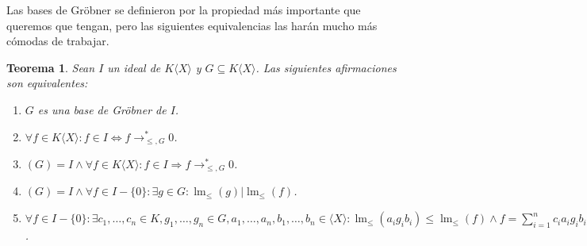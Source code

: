 \documentclass[12pt]{report}
\theoremstyle{customstyle}
\newtheorem{theorem}{Teorema}[chapter]
\theoremstyle{factstyle}
\DeclareMathOperator{\lm}{lm}
\begin{document}
Las bases de Gröbner se definieron por la propiedad más importante que queremos que tengan, pero las siguientes equivalencias las harán mucho más cómodas de trabajar.

\begin{theorem}\label{thm:equivalencias de base de Gröbner}
  Sean $I$ un ideal de $K⟨X⟩$ y $G ⊆ K⟨X⟩$. Las siguientes afirmaciones son equivalentes:
  \begin{enumerate}
    \item $G$ es una base de Gröbner de $I$. \label{thm:egb:1}

    \item $∀f ∈ K⟨X⟩ : f ∈ I ⇔ f →^*_{≤, G} 0$. \label{thm:egb:2}

    \item $(G) = I ∧ ∀f ∈ K⟨X⟩ : f ∈ I ⇒ f →^*_{≤, G} 0$. \label{thm:egb:3}

    \item $(G) = I ∧ ∀f ∈ I - \{0\} : ∃g ∈ G : \lm_≤(g) | \lm_≤(f)$. \label{thm:egb:4}

    \item $∀f ∈ I - \{0\} : ∃c_1, …, c_n ∈ K, g_1, …, g_n ∈ G, a_1, …, a_n, b_1, …, b_n ∈ ⟨X⟩ : \lm_≤(a_i g_i b_i) ≤ \lm_≤(f) ∧ f = ∑_{i = 1}^n c_i a_i g_i b_i$.  \label{thm:egb:5}
  \end{enumerate}
\end{theorem}
\end{document}

